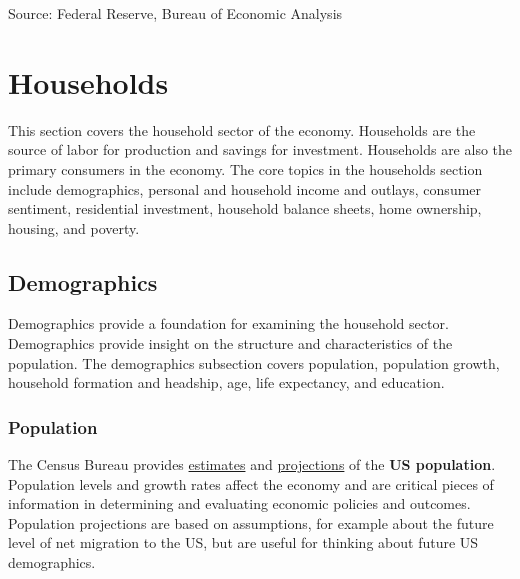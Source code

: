 \documentclass{report}
\begin{document}
{\begin{minipage}{0.76\textwidth}
 \setlength{\tabcolsep}{3.5pt} \color{black!90}
		{\renewcommand{\arraystretch}{1.5}
		 \begin{tabular}{p{42mm} R{7.8mm} R{7.8mm} R{7.8mm} R{7.8mm} 
		   R{8.2mm} R{8.2mm} R{8.2mm} }
			  \hline
		\end{tabular}}	\vspace{-2mm}
		
\footnotesize{Source: Federal Reserve, Bureau of Economic Analysis}
\end{minipage}
\newpage
\hypertarget{hh}{}
\begin{minipage}{0.76\textwidth}
\section*{Households}
\small This section covers the household sector of the economy. Households are the source of labor for production and savings for investment. Households are also the primary consumers in the economy. The core topics in the households section include demographics, personal and household income and outlays, consumer sentiment, residential investment, household balance sheets, home ownership, housing, and poverty.

\hypertarget{hhdem}{}
\subsection*{Demographics}
\vspace{-1.0mm}

\small Demographics provide a foundation for examining the household sector. Demographics provide insight on the structure and characteristics of the population. The demographics subsection covers population, population growth, household formation and headship, age, life expectancy, and education.

\subsubsection*{Population}
\small The Census Bureau provides \href{https://www.census.gov/programs-surveys/popest.html}{estimates} and \href{https://www.census.gov/programs-surveys/popproj.html}{projections} of the \textbf{US population}. Population levels and growth rates affect the economy and are critical pieces of information in determining and evaluating economic policies and outcomes. Population projections are based on assumptions, for example about the future level of net migration to the US, but are useful for thinking about future US demographics.


\end{minipage}}
\end{document}
